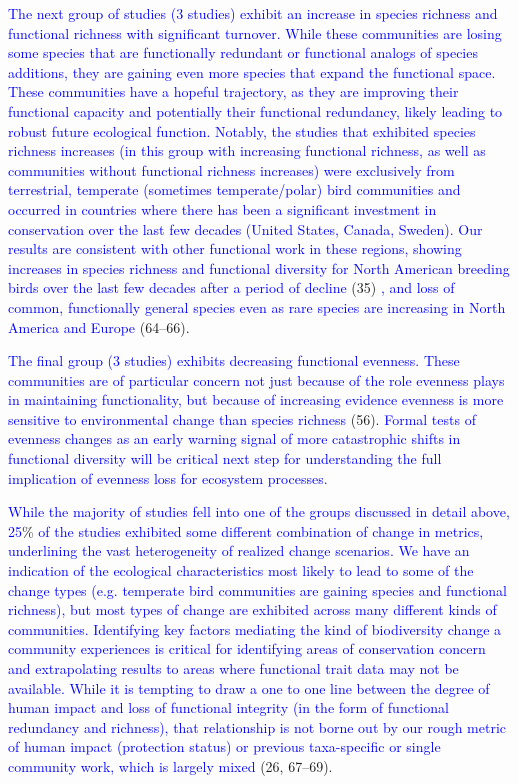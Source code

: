 \documentclass{article}
\begin{document}
\textcolor{blue}{The next group of studies (3 studies) exhibit an increase in species richness and functional richness with significant turnover. While these communities are losing some species that are functionally redundant or functional analogs of species additions, they are gaining even more species that expand the functional space. These communities have a hopeful trajectory, as they are improving their functional capacity and potentially their functional redundancy, likely leading to robust future ecological function. Notably, the studies that exhibited species richness increases (in this group with increasing functional richness, as well as communities without functional richness increases) were exclusively from terrestrial, temperate (sometimes temperate/polar) bird communities and occurred in countries where there has been a significant investment in conservation over the last few decades (United States, Canada, Sweden). Our results are consistent with other functional work in these regions, showing increases in species richness and functional diversity for North American breeding birds over the last few decades after a period of decline}
(35)
\textcolor{blue}{, and loss of common, functionally general species even as rare species are increasing in North America and Europe }
(64--66).

\textcolor{blue}{The final group (3 studies) exhibits decreasing functional evenness. These communities are of particular concern not just because of the role evenness plays in maintaining functionality, but because of increasing evidence evenness is more sensitive to environmental change than species richness}
(56).
\textcolor{blue}{Formal tests of evenness changes as an early warning signal of more catastrophic shifts in functional diversity will be critical next step for understanding the full implication of evenness loss for ecosystem processes.}

\textcolor{blue}{While the majority of studies fell into one of the groups discussed in detail above, 25}\%
\textcolor{blue}{of the studies exhibited some different combination of change in metrics, underlining the vast heterogeneity of realized change scenarios.}
\textcolor{blue}{We have an indication of the ecological characteristics most likely to lead to some of the change types (e.g. temperate bird communities are gaining species and functional richness), but most types of change are exhibited across many different kinds of communities. }
\textcolor{blue}{Identifying key factors mediating the kind of biodiversity change a community experiences is critical for identifying areas of conservation concern and extrapolating results to areas where functional trait data may not be available. While it is tempting to draw a one to one line between the degree of human impact and loss of functional integrity (in the form of functional redundancy and richness), that relationship is not borne out by our rough metric of human impact (protection status) or previous taxa-specific or single community work, which is largely mixed}
(26, 67--69).
\end{document}
